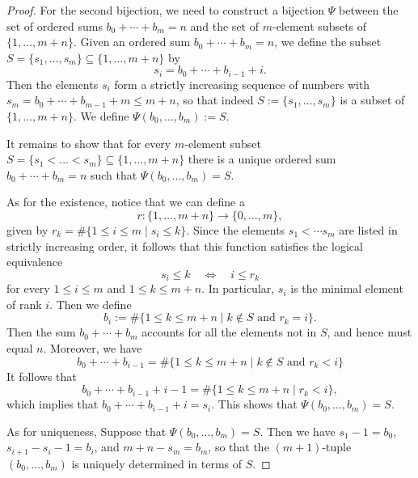 \begin{proof}
  For the second bijection, we need to construct a bijection $\Psi$ between the set of ordered sums $b_0+\cdots+b_m=n$ and the set of $m$-element subsets of $\{1,\ldots,m+n\}$. Given an ordered sum $b_0+\cdots+b_m=n$, we define the subset $S=\{s_1,\ldots,s_m\}\subseteq\{1,\ldots,m+n\}$ by
  \begin{equation*}
    s_i=b_0+\cdots+b_{i-1}+i.
  \end{equation*}
  Then the elements $s_i$ form a strictly increasing sequence of numbers with $s_m=b_0+\cdots+b_{m-1}+m\leq m+n$, so that indeed $S:=\{s_1,\ldots,s_m\}$ is a subset of $\{1,\ldots,m+n\}$. We define $\Psi(b_0,\ldots,b_m):=S$.

  It remains to show that for every $m$-element subset $S=\{s_1<\ldots<s_m\}\subseteq\{1,\ldots,m+n\}$ there is a unique ordered sum $b_0+\cdots+b_m=n$ such that $\Psi(b_0,\ldots,b_m)=S$.

  As for the existence, notice that we can define a 
  \begin{equation*}
    r : \{1,\ldots,m+n\}\to\{0,\ldots,m\},
  \end{equation*}
  given by $r_k=\#\{1\leq i\leq m\mid s_i\leq k\}$. Since the elements $s_1<\cdots s_m$ are listed in strictly increasing order, it follows that this function satisfies the logical equivalence
  \begin{equation*}
    s_i\leq k\quad\Leftrightarrow\quad i\leq r_k
  \end{equation*}
  for every $1\leq i\leq m$ and $1\leq k\leq m+n$. In particular, $s_i$ is the minimal element of rank $i$. Then we define
  \begin{equation*}
    b_i:=\#\{1\leq k\leq m+n\mid k\notin S\text{ and }r_k=i\}.
  \end{equation*}
  Then the sum $b_0+\cdots+b_m$ accounts for all the elements not in $S$, and hence must equal $n$. Moreover, we have
  \begin{equation*}
    b_0+\cdots+b_{i-1}=\#\{1\leq k\leq m+n\mid k\notin S\text{ and }r_k<i\}
  \end{equation*}
  It follows that
  \begin{equation*}
    b_0+\cdots+b_{i-1}+i-1 =\#\{1\leq k\leq m+n\mid r_k<i\},
  \end{equation*}
  which implies that $b_0+\cdots+b_{i-1}+i=s_i$. This shows that $\Psi(b_0,\ldots,b_m)=S$.

  As for uniqueness, Suppose that $\Psi(b_0,\ldots,b_m)=S$. Then we have $s_1-1=b_0$, $s_{i+1}-s_i-1=b_i$, and $m+n-s_m=b_m$, so that the $(m+1)$-tuple $(b_0,\ldots,b_m)$ is uniquely determined in terms of $S$.
\end{proof}

